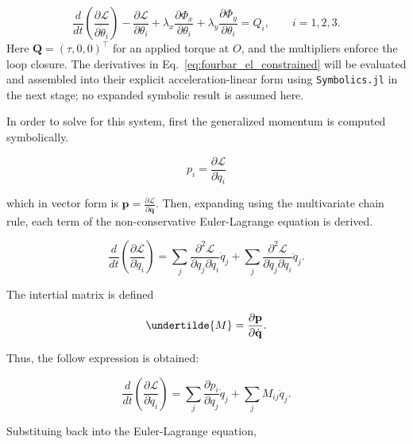 \begin{equation}
    \frac{d}{dt}\left(\frac{\partial\mathcal L}{\partial\dot\theta_i}\right)
    -\frac{\partial\mathcal L}{\partial\theta_i}
    +\lambda_x\frac{\partial\Phi_x}{\partial\theta_i}
    +\lambda_y\frac{\partial\Phi_y}{\partial\theta_i}
    =Q_i,\qquad i=1,2,3.
    \label{eq:fourbar_el_constrained}
\end{equation}
Here $\mathbf Q=(\tau,0,0)^\top$ for an applied torque at $O$, and the multipliers enforce the loop closure. The derivatives in Eq.~\eqref{eq:fourbar_el_constrained} will be evaluated and assembled into their explicit acceleration-linear form using \texttt{Symbolics.jl} in the next stage; no expanded symbolic result is assumed here.

In order to solve for this system, first the generalized momentum is
computed symbolically.

\begin{equation}
    p_i = \frac{\partial \mathcal L}{\partial \dot q_i}
\end{equation}

which in vector form is $\mathbf p = \frac{\partial \mathcal L}{\partial \dot{\mathbf q}}$. Then, expanding using
the multivariate chain rule, each term of the non-conservative Euler-Lagrange equation is
derived.

\begin{equation}
    \frac{d}{dt}
    \left(
    \frac{\partial\mathcal L}{\partial\dot q_i}
    \right)
    =
    \sum_j
    \frac{\partial^2\mathcal L}
    {\partial q_j\partial\dot q_i}
    \dot q_j
    +
    \sum_j
    \frac{\partial^2\mathcal L}
    {\partial\dot q_j\partial\dot q_i}
    \ddot q_j.
\end{equation}

The intertial matrix is defined

\begin{equation}
    \undertilde{M} = \frac{\partial \mathbf{p}}{\partial \dot{\mathbf{q}}}.
\end{equation}

Thus, the follow expression is obtained:

\begin{equation}
    \frac{d}{dt}
    \left(
    \frac{\partial\mathcal L}{\partial\dot q_i}
    \right)
    =
    \sum_j
    \frac{\partial p_i}{\partial q_j}\dot q_j
    +
    \sum_j M_{ij}\ddot q_j.
\end{equation}

Substituing back into the Euler-Lagrange equation,


